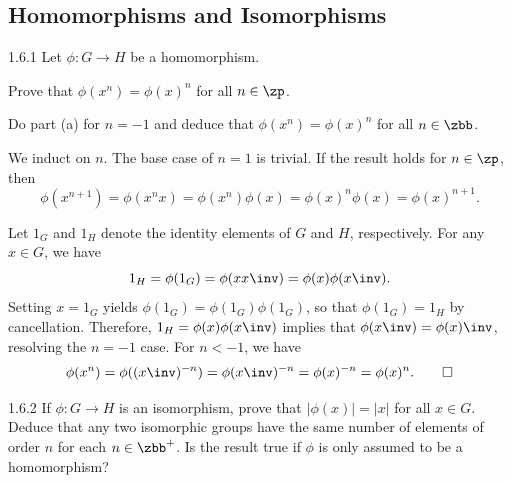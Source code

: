 \subsection{Homomorphisms and Isomorphisms}

\begin{exercise}{1.6.1}
    Let $\phi : G \to H$ be a homomorphism.
    \begin{subexercises}
        \item Prove that $\phi(x^n) = \phi(x)^n$ for all $n \in \zp$.
        \item Do part (a) for $n = - 1$ and deduce that $\phi(x^n) = \phi(x)^n$ for all $n \in \zbb$.
    \end{subexercises}
\end{exercise}

\begin{solenum}
    \item We induct on $n$. The base case of $n = 1$ is trivial.
	If the result holds for $n \in \zp$, then
    \[
    	\phi(x^{n + 1}) = \phi(x^nx) = \phi(x^n)\phi(x) = \phi(x)^n\phi(x) = \phi(x)^{n + 1}.
    \]
    \item Let $1_G$ and $1_H$ denote the identity elements of $G$ and $H$, respectively.
    For any $x \in G$, we have
    \[
        1_H = \phi(1_G) = \phi(xx\inv) = \phi(x)\phi(x\inv).
    \]
    Setting $x = 1_G$ yields $\phi(1_G) = \phi(1_G)\phi(1_G)$, so that $\phi(1_G) = 1_H$ by cancellation.
    Therefore, $1_H = \phi(x)\phi(x\inv)$ implies that $\phi(x\inv) = \phi(x)\inv$, resolving the $n = -1$ case.
    For $n < -1$, we have
    \[
    	\phi(x^n) = \phi((x\inv)^{-n}) = \phi(x\inv)^{-n} = \phi(x)^{-n} = \phi(x)^n. \qedhere
    \]
\end{solenum}

\begin{spex}{1.6.2}
    If $\phi : G \to H$ is an isomorphism, prove that $|\phi(x)| = |x|$ for all $x \in G$.
	Deduce that any two isomorphic groups have the same number of elements of order $n$ for each $n \in \zbb^+$.
	Is the result true if $\phi$ is only assumed to be a homomorphism?
\end{spex}

